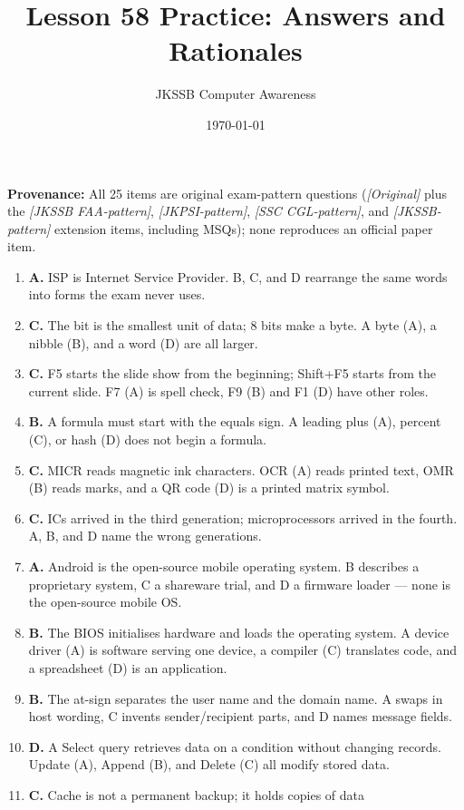 \documentclass[11pt]{article}
\title{Lesson 58 Practice: Answers and Rationales}
\author{JKSSB Computer Awareness}
\date{\today}
\begin{document}
\maketitle
\noindent\textbf{Provenance:} All 25 items are original exam-pattern questions (\textit{[Original]} plus the \textit{[JKSSB FAA-pattern]}, \textit{[JKPSI-pattern]}, \textit{[SSC CGL-pattern]}, and \textit{[JKSSB-pattern]} extension items, including MSQs); none reproduces an official paper item.
\begin{enumerate}[label=\textbf{Q\arabic*.}, leftmargin=*]
\item \textbf{A.} ISP is Internet Service Provider. B, C, and D rearrange
  the same words into forms the exam never uses.
\item \textbf{C.} The bit is the smallest unit of data; 8 bits make a byte.
  A byte (A), a nibble (B), and a word (D) are all larger.
\item \textbf{C.} F5 starts the slide show from the beginning; Shift+F5
  starts from the current slide. F7 (A) is spell check, F9 (B) and F1 (D)
  have other roles.
\item \textbf{B.} A formula must start with the equals sign. A leading plus
  (A), percent (C), or hash (D) does not begin a formula.
\item \textbf{C.} MICR reads magnetic ink characters. OCR (A) reads printed
  text, OMR (B) reads marks, and a QR code (D) is a printed matrix symbol.
\item \textbf{C.} ICs arrived in the third generation; microprocessors
  arrived in the fourth. A, B, and D name the wrong generations.
\item \textbf{A.} Android is the open-source mobile operating system. B
  describes a proprietary system, C a shareware trial, and D a firmware
  loader --- none is the open-source mobile OS.
\item \textbf{B.} The BIOS initialises hardware and loads the operating
  system. A device driver (A) is software serving one device, a compiler (C)
  translates code, and a spreadsheet (D) is an application.
\item \textbf{B.} The at-sign separates the user name and the domain name.
  A swaps in host wording, C invents sender/recipient parts, and D names
  message fields.
\item \textbf{D.} A Select query retrieves data on a condition without
  changing records. Update (A), Append (B), and Delete (C) all modify
  stored data.
\item \textbf{C.} Cache is not a permanent backup; it holds copies of data

\end{enumerate}
\end{document}

